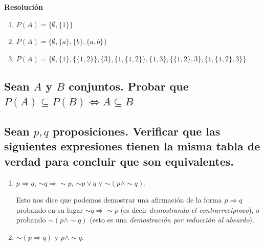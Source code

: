 \documentclass[11pt]{article}
\begin{document}
\textbf{Resolución}

\begin{enumerate}[label=\roman*)]
    \item \(P(A) = \{\emptyset, \{1\}\}\)
    \item \(P(A) = \{\emptyset, \{a\}, \{b\}, \{a, b\}\}\)
    \item \(P(A) = \{\emptyset, \{1\}, \{\{1,2\}\}, \{3\}, \{1, \{1,2\}\}, \{1, 3\}, \{\{1,2\}, 3\}, \{1, \{1,2\}, 3\}\}\)
\end{enumerate}

\subsection{Sean \(A\) y \(B\) conjuntos. Probar que \(P(A) \subseteq P(B) \Leftrightarrow A \subseteq B\)}

\subsection{Sean \(p, q\) proposiciones. Verificar que las siguientes expresiones tienen la misma tabla de verdad para concluir que son equivalentes.}

\begin{enumerate}[label=\roman*)]
\item \(p \Rightarrow q\), \quad \(\sim q \Rightarrow \sim p\), \quad \(\sim p \lor q\) \quad y \quad \(\sim (p \land \sim q)\).

Esto nos dice que podemos demostrar una afirmación de la forma \(p \Rightarrow q\) probando en su lugar 
\(\sim q \Rightarrow \sim p\) (es decir \textit{demostrando el contrarrecíproco}), 
o probando \(\sim (p \land \sim q)\) (esto es una \textit{demostración por reducción al absurdo}).

\item \(\sim (p \Rightarrow q)\) \quad y \quad \(p \land \sim q\).

\end{enumerate}
\end{document}
